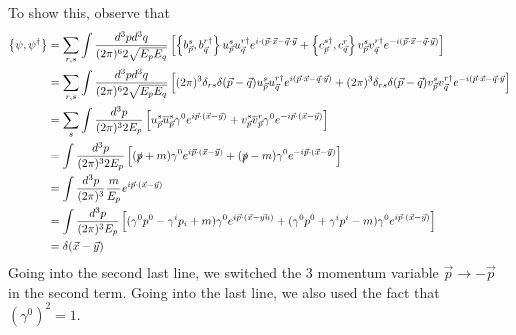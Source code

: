 To show this, observe that 
\begin{align*}
	\left\{  \psi , \psi ^ \dagger  \right\}  &=  \sum_{ r, s } \int 
	\frac{ d ^ 3 p d ^ 3 q }{( 2 \pi )^{6 }  2 \sqrt{ E_{ p } E_{q }  }  } 
	\left[  \left\{  b _{ \vec{p} } ^{ s } , b _{ \vec{q} } ^{ r \dagger }  \right\}  
	u _{ \vec{p} } ^{ s } u _{ \vec{q} } ^{ r \dagger } e ^{ i \cdot  ( \vec{p} \cdot  \vec{x}  - \vec{q} \cdot  \vec{y}}
 + \left\{  c_{\vec{p} } ^{ s \dagger } , c_{\vec{q} } ^{ r }  \right\}  v _{ \vec{p} } ^ s v _{ \vec{q} } ^{ r \dagger } 
 e ^{ - i ( \vec{p} \cdot  \vec{x} - \vec{q} \cdot  \vec{y} ) }\right] \\
 &= \sum_{ r, s } \int \frac{d ^ 3 p d ^ 3 q}{ ( 2 \pi )^{ 6 }  2 \sqrt{ 
 E_ p  E_ q } } \left[  ( 2 \pi )^{ 3 }  \delta _{ rs } \delta ( \vec{p} - \vec{q} ) 
 u_{ \vec{p} } ^{ s } u _{ \vec{q}  } ^{ r \dagger } e ^{ i ( \vec{p} \cdot  \vec{x} - \vec{q} \cdot  \vec{y} ) } +  ( 2 \pi )^{ 3 }  \delta _{ rs } \delta ( \vec{p} - \vec{q} ) v _{ \vec{p} } ^{ s } v _{ \vec{q} } ^{ r \dagger } e ^{ - i ( \vec{p} \cdot  \vec{x} - \vec{q} \cdot  \vec{y}}\right] \\
  &=  \sum _ s \int \frac{d ^ 3 p  }{ ( 2 \pi )^{ 3 }  2 E _ p } \left[  
  u _{ \vec{p}  } ^{ s } \overline{u} _{\vec{p} } ^{ s } \gamma ^ 0 e ^{ i \vec{p} \cdot  ( \vec{x} - \vec{y} ) } 
   + v_{ \vec{p} } ^{ s } \overline{v}_{ \vec{p} } ^{ r } \gamma ^ 0 e ^{  -i \vec{p} \cdot  ( \vec{x} - \vec{y} ) }\right]  \\
  &=  \int \frac{ d ^ 3 p  }{ ( 2 \pi )^{ 3 }  2 E_{p } } \left[ ( 
  \slashed{p} + m  ) \gamma ^ 0 e ^{ i \vec{p} \cdot  ( \vec{x} - \vec{y} ) }
   +  ( \slashed{p} -m ) \gamma ^ 0  e ^{  -i \vec{p} \cdot  ( \vec{x} - \vec{y}) } \right]  \\
   &=   \int \frac{ d ^ 3 p  }{ ( 2 \pi )^{ 3 }  } 
   \frac{ m }{ E_{ p }  } e ^{ i \vec{p} \cdot  ( \vec{x} - \vec{y} ) }\\
   &=  \int \frac{ d ^ 3 p  }{ ( 2 \pi )^{ 3 }  E_{ p }  } \left[  
   ( \gamma ^ 0 p ^ 0 - \gamma ^ i p _ i + m ) \gamma ^ 0 e ^{ i \vec{p} \cdot  ( \vec{x} - \vec{yu} ) }
    + ( \gamma ^ 0 p ^ 0 + \gamma ^ i p ^ i - m ) \gamma ^ 0 e ^{ i \vec{p} \cdot  ( \vec{x} - \vec{y} ) }\right]  \\
   &=  \delta ( \vec{x} - \vec{y} )  \\
\end{align*}
Going into the second last line, we switched the 
3 momentum variable $ \vec{p} \to  - \vec{p} $ in the second term. 
Going into the last line, we also used the fact that $ ( \gamma ^ 0 ) ^ 2  =1 $. 

